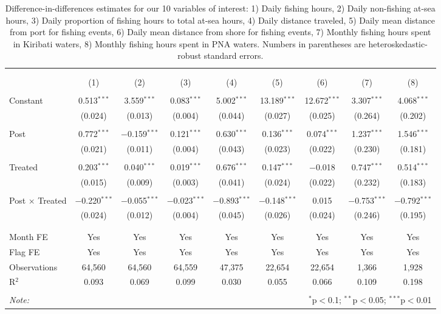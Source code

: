 
\begin{table}[!htbp] \centering 
  \caption{\label{tab:DID_without_PNA}Difference-in-differences estimates for our 10 variables of interest: 1) Daily fishing hours, 2) Daily non-fishing at-sea hours, 3) Daily proportion of fishing hours to total at-sea hours, 4) Daily distance traveled, 5) Daily mean distance from port for fishing events, 6) Daily mean distance from shore for fishing events, 7) Monthly fishing hours spent in Kiribati waters, 8) Monthly fishing hours spent in PNA waters. Numbers in parentheses are heteroskedastic-robust standard errors.} 
  \label{} 
\footnotesize 
\begin{tabular}{@{\extracolsep{1pt}}lcccccccc} 
\\[-1.8ex]\hline 
\hline \\[-1.8ex] 
\\[-1.8ex] & (1) & (2) & (3) & (4) & (5) & (6) & (7) & (8)\\ 
\hline \\[-1.8ex] 
 Constant & 0.513$^{***}$ & 3.559$^{***}$ & 0.083$^{***}$ & 5.002$^{***}$ & 13.189$^{***}$ & 12.672$^{***}$ & 3.307$^{***}$ & 4.068$^{***}$ \\ 
  & (0.024) & (0.013) & (0.004) & (0.044) & (0.027) & (0.025) & (0.264) & (0.202) \\ 
  & & & & & & & & \\ 
 Post & 0.772$^{***}$ & $-$0.159$^{***}$ & 0.121$^{***}$ & 0.630$^{***}$ & 0.136$^{***}$ & 0.074$^{***}$ & 1.237$^{***}$ & 1.546$^{***}$ \\ 
  & (0.021) & (0.011) & (0.004) & (0.043) & (0.023) & (0.022) & (0.230) & (0.181) \\ 
  & & & & & & & & \\ 
 Treated & 0.203$^{***}$ & 0.040$^{***}$ & 0.019$^{***}$ & 0.676$^{***}$ & 0.147$^{***}$ & $-$0.018 & 0.747$^{***}$ & 0.514$^{***}$ \\ 
  & (0.015) & (0.009) & (0.003) & (0.041) & (0.024) & (0.022) & (0.232) & (0.183) \\ 
  & & & & & & & & \\ 
 Post $\times$ Treated & $-$0.220$^{***}$ & $-$0.055$^{***}$ & $-$0.023$^{***}$ & $-$0.893$^{***}$ & $-$0.148$^{***}$ & 0.015 & $-$0.753$^{***}$ & $-$0.792$^{***}$ \\ 
  & (0.024) & (0.012) & (0.004) & (0.045) & (0.026) & (0.024) & (0.246) & (0.195) \\ 
  & & & & & & & & \\ 
\hline \\[-1.8ex] 
Month FE & Yes & Yes & Yes & Yes & Yes & Yes & Yes & Yes \\ 
Flag FE & Yes & Yes & Yes & Yes & Yes & Yes & Yes & Yes \\ 
Observations & 64,560 & 64,560 & 64,559 & 47,375 & 22,654 & 22,654 & 1,366 & 1,928 \\ 
R$^{2}$ & 0.093 & 0.069 & 0.099 & 0.030 & 0.055 & 0.066 & 0.109 & 0.198 \\ 
\hline 
\hline \\[-1.8ex] 
\textit{Note:}  & \multicolumn{8}{r}{$^{*}$p$<$0.1; $^{**}$p$<$0.05; $^{***}$p$<$0.01} \\ 
\end{tabular} 
\end{table} 
